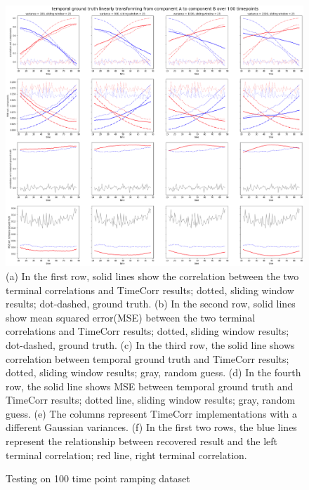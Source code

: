 \documentclass[11pt]{article}
\begin{document}
\begin{figure}[!htb]
\caption{Testing on 100 time point ramping dataset}
\includegraphics[width=1\textwidth]{../figures/SyntheticTesting/ramp100t4var.png}
\label{fig:ramp100t4var}
(a) In the first row, solid lines show the correlation between the two terminal correlations and TimeCorr results; dotted, sliding window results; dot-dashed, ground truth. (b) In the second row, solid lines show mean squared error(MSE) between the two terminal correlations and TimeCorr results; dotted, sliding window results; dot-dashed, ground truth. (c) In the third row, the solid line shows correlation between temporal ground truth and TimeCorr results; dotted, sliding window results; gray, random guess. (d) In the fourth row, the solid line shows MSE between temporal ground truth and TimeCorr results; dotted line, sliding window results; gray, random guess. (e) The columns represent TimeCorr implementations with a different Gaussian variances. (f) In the first two rows, the blue lines represent the relationship between recovered result and the left terminal correlation; red line, right terminal correlation.
\end{figure}
\end{document}
